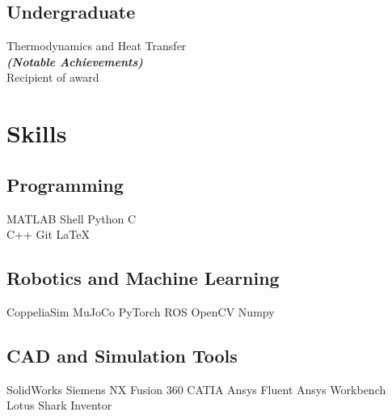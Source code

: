 \documentclass[]{deedy-resume-openfont}
\begin{document}
\begin{minipage}[t]{0.33\textwidth}
\subsection{Undergraduate}
Thermodynamics and Heat Transfer \\
{\footnotesize \textit{\textbf{(Notable Achievements) }}} \\
Recipient of award \\


\section{Skills}
\subsection{Programming}
MATLAB \textbullet{}   Shell \textbullet{} Python \textbullet{} C \\
C++ \textbullet{} Git\textbullet{} \LaTeX\ \\ 
\subsection{Robotics and Machine Learning}
CoppeliaSim \textbullet{} MuJoCo \textbullet{} PyTorch\textbullet{}  ROS \textbullet{} OpenCV \textbullet{} Numpy 
\subsection{CAD and Simulation Tools}
SolidWorks \textbullet{} Siemens NX \textbullet{} Fusion 360 \textbullet{} 
CATIA \textbullet{} Ansys Fluent \textbullet{} Ansys Workbench \textbullet{} Lotus Shark \textbullet{} Inventor
%
%

\end{minipage} 
\hfill
\end{document}
